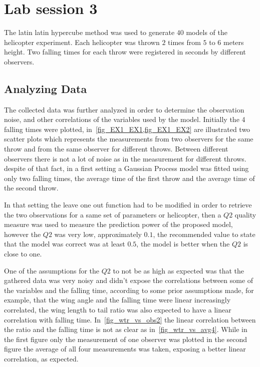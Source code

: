 \section{Lab session 3}

The latin latin hypercube method was used to generate $40$ models of the
helicopter experiment. Each helicopter was thrown $2$ times from $5$ to $6$
meters height. Two falling times for each throw were registered in seconds by
different observers.

\subsection{Analyzing Data}

The collected data was further analyzed in order to determine the observation
noise, and other correlations of the variables used by the model. Initially the
4 falling times were plotted, in~\cref{fig_EX1_EX1,fig_EX1_EX2} are illustrated
two scatter plots which represents the measurements from two observers for the
same throw and from the same observer for different throws. Between different
observers there is not a lot of noise as in the measurement for different
throws. despite of that fact, in a first setting a Gaussian Process model was
fitted using only two falling times, the average time of the first throw and the
average time of the second throw.

In that setting the leave one out function had to be modified in order to
retrieve the two observations for a same set of parameters or helicopter, then a
$Q2$ quality measure was used to measure the prediction power of the proposed
model, however the $Q2$ was very low, approximately $0.1$, the recommended value
to state that the model was correct was at least $0.5$, the model is better when
the $Q2$ is close to one.

One of the assumptions for the $Q2$ to not be as high as expected was that the
gathered data was very noisy and didn't expose the correlations between some of
the variables and the falling time, according to some prior assumptions made,
for example, that the wing angle and the falling time were linear increasingly
correlated, the wing length to tail ratio was also expected to have a linear
correlation with falling time. In~\cref{fig_wtr_vs_obs2} the linear correlation
between the ratio and the falling time is not as clear as
in~\cref{fig_wtr_vs_avg4}. While in the first figure only the measurement of one
observer was plotted in the second figure the average of all four measurements
was taken, exposing a better linear correlation, as expected.

